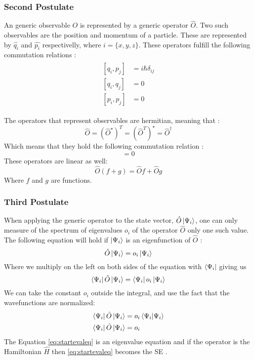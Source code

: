 \documentclass[../master_thesis.tex]{subfiles}
\begin{document}
\subsubsection{Second Postulate}
An generic observable $O$ is represented by a generic operator $\hat{O}$. Two
such observables are the position and momentum of a particle. These are
represented by $\hat{q_i}$ and $\hat{p_i}$ respectivelly, where
$i = \{x, y, z\}$. These operators fulfill the following commutation relations
\cite{Atkins:2011, Cohen:1973}:
\begin{align}
  \begin{split}
    [q_i, p_j] &= i \hbar \delta_{ij}\\
    [q_i, q_j] &= 0 \\
    [p_i, p_j] &= 0
  \end{split}
\end{align}

The operators that represent observables are hermitian, meaning that
\cite{Cohen:1973}:
\begin{equation}
  \hat{O} = (\hat{O}^{\star})^T = (\hat{O}^T)^{\star} = \hat{O}^{\dagger}
\end{equation}
Which means that they hold the following commutation relation
\cite{Cohen:1973}:
\begin{equation}
  [\hat{O}, \hat{O}^{\dagger}] = 0
\end{equation}
These operators are linear as well:
\begin{equation}
    \hat{O}(f + g) = \hat{O}f + \hat{O}g\label{eq:oplinearity}
\end{equation}
Where $f$ and $g$ are functions.

\subsubsection{Third Postulate}
When applying the generic operator to the state vector, $\hat{O}\ket{\Psi_i}$,
one can only measure of the spectrum of eigenvalues $o_i$ of the operator $\hat{O}$
only one such value. The following equation will hold if $\ket{\Psi_i}$ is an
eigenfunction of $\hat{O}$
\cite{Cohen:1973, Atkins:2014}:
\begin{equation}
  \hat{O}\ket{\Psi_i} = o_i\ket{\Psi_i}\label{eq:startevaleq}
\end{equation}
Where we multiply on the left on both sides of the equation with $\bra{\Psi_i}$
giving us
\begin{equation}
  \bra{\Psi_i}\hat{O}\ket{\Psi_i} = \bra{\Psi_i}o_i\ket{\Psi_i}
\end{equation}
We can take the constant $o_i$ outside the integral, and
use the fact that the wavefunctions are normalized:
\begin{align}
  \begin{split}
    \bra{\Psi_i}\hat{O}\ket{\Psi_i} &= o_i\braket{\Psi_i|\Psi_i}\\
    \bra{\Psi_i}\hat{O}\ket{\Psi_i} &= o_i \label{eq:endevaleq}
  \end{split}
\end{align}
The Equation \ref{eq:startevaleq} is an eigenvalue equation and if the operator is
the Hamiltonian $\hat{H}$ then \ref{eq:startevaleq} becomes the \ac{SE} \cite{Cramer:2004}.
\end{document}

